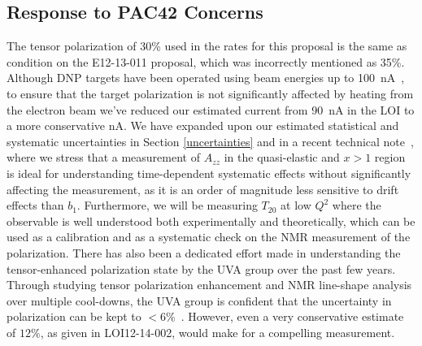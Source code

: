 \subsection{Response to PAC42 Concerns}
The tensor polarization of 30\% used in the rates for this proposal is the same as condition on the E12-13-011 proposal, which was incorrectly mentioned as 35\%. Although DNP targets have been operated using beam energies up to 100~nA~\cite{Averett:1999nz, Pierce:2013pua}, to ensure that the target polarization is not significantly affected by heating from the electron beam we've reduced our estimated current from 90~nA in the LOI to a more conservative \CURRENT nA. We have expanded upon our estimated statistical and systematic uncertainties in Section \ref{uncertainties} and in a recent technical note~\cite{Keller:2015tn}, where we stress that a measurement of $A_{zz}$ in the quasi-elastic and $x>1$ region is ideal for understanding time-dependent systematic effects without significantly affecting the measurement, as it is an order of magnitude less sensitive to drift effects than $b_1$. Furthermore, we will be measuring $T_{20}$ at low $Q^2$ where the observable is well understood both experimentally and theoretically, which can be used as a calibration and as a systematic check on the NMR measurement of
the polarization. There has also been a dedicated effort made in understanding the tensor-enhanced polarization state by the UVA group over the past few years. Through studying tensor polarization enhancement and NMR line-shape analysis over multiple cool-downs, the UVA group is confident that the uncertainty in polarization can be kept to $<6\%$~\cite{keller2, keller3}. However, even a very conservative estimate of $12\%$, as given in LOI12-14-002, would make for a compelling measurement.


